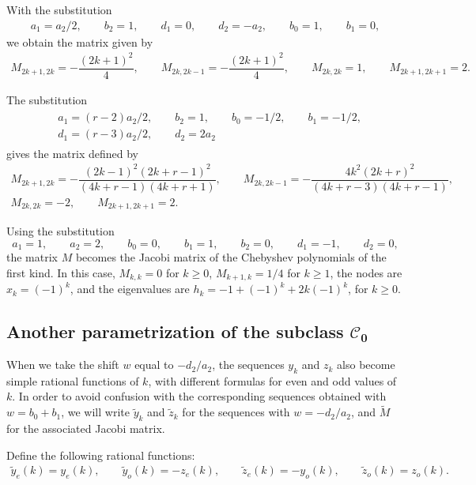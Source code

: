 \documentclass[pdftex]{sigma}
\def\cC{\mathcal C}
\numberwithin{equation}{section}
\begin{document}
With the substitution
\begin{gather*}
 a_1=a_2/2,\qquad b_2=1,\qquad d_1=0,\qquad d_2=-a_2,\qquad b_0=1,\qquad b_1=0,
\end{gather*}
we obtain the matrix given by
\begin{gather*}%
	M_{2k+1,2k}= -\dfrac{(2k+1)^2}{4}, \qquad\!
	M_{2k,2k-1}= -\dfrac{(2k+1)^2}{4},\qquad\!
	M_{2k,2k}= 1,\qquad\!
	M_{2k+1,2k+1}= 2.
\end{gather*}

The substitution
\begin{gather*}
\begin{split}
&a_1=(r-2)a_2/2,\qquad b_2=1,\qquad b_0=-1/2,\qquad b_1=-1/2,\\
 & d_1=(r-3)a_2/2,\qquad d_2= 2 a_2
\end{split}
\end{gather*}
gives the matrix defined by
\begin{gather*}%
	M_{2k+1,2k}= -\dfrac{(2k-1)^2 (2k+r-1)^2}{(4k+r-1)(4k+r+1)}, \qquad
	M_{2k,2k-1}= -\dfrac{4 k^2(2k+r)^2}{(4k+r-3)(4k+r-1)},\\
	M_{2k,2k}= -2,\qquad
	M_{2k+1,2k+1}=2.
\end{gather*}

Using the substitution
\[ a_1=1,\qquad a_2= 2,\qquad b_0=0,\qquad b_1=1,\qquad b_2=0,\qquad d_1=-1,\qquad d_2=0, \]
 the matrix $M$ becomes the Jacobi matrix of the Chebyshev polynomials of the first kind.
In this case, $M_{k,k}=0$ for $k\ge 0$, $M_{k+1,k}=1/4$ for $k \ge 1$, the nodes are $ x_k=(-1)^k$, and the eigenvalues are $h_k=-1+(-1)^k+ 2 k (-1)^k$, for $k\ge 0$.

\subsection[Another parametrization of the subclass C\_0]{Another parametrization of the subclass $\boldsymbol{\cC_0}$}
When we take the shift $w$ equal to $-d_2/a_2$, the sequences $y_k$ and $z_k$ also become simple rational functions of $k$, with different formulas for even and odd values of $k$. In order to avoid confusion with the corresponding sequences obtained with $w=b_0+b_1$, we will write $\tilde y_k$ and $\tilde z_k$ for the sequences with $w=-d_2/a_2$, and $\tilde M$ for the associated Jacobi matrix.

 Define the following rational functions:
 \begin{gather*}%
	 \tilde y_e(k)= y_e(k), \qquad \tilde 	y_o(k)= - z_e(k),\qquad
	 \tilde 	z_e(k)=- y_o(k), \qquad \tilde z_o(k) = z_o(k).
\end{gather*}
\end{document}
